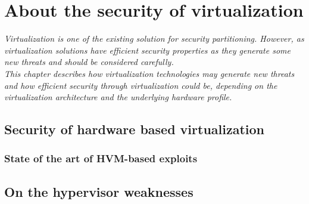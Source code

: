 
\chapter{About the security of virtualization}

{\it
Virtualization is one of the existing solution for security partitioning. However, as
virtualization solutions have efficient security properties as they generate some new threats and
should be considered carefully.\\
This chapter describes how virtualization technologies may generate new threats and how efficient
security through virtualization could be, depending on the virtualization architecture and the
underlying hardware profile.
}

\doMinitoc

\section{Security of hardware based virtualization}

\subsection{State of the art of HVM-based exploits}

\section{On the hypervisor weaknesses}

